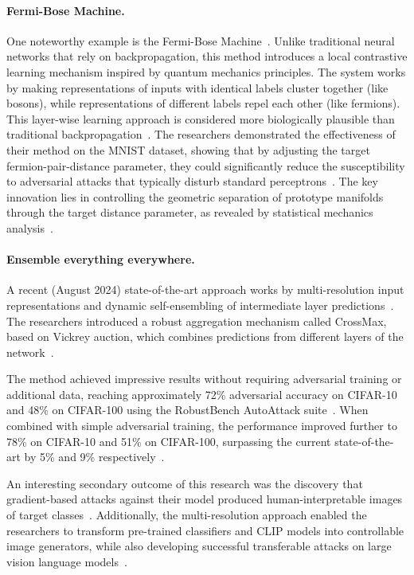 \documentclass[a4paper, oneside]{discothesis}
\begin{document}
\paragraph{Fermi-Bose Machine.} One noteworthy example is the Fermi-Bose Machine~\cite{xie2024fermi}. Unlike traditional neural networks that rely on backpropagation, this method introduces a local contrastive learning mechanism inspired by quantum mechanics principles. The system works by making representations of inputs with identical labels cluster together (like bosons), while representations of different labels repel each other (like fermions). This layer-wise learning approach is considered more biologically plausible than traditional backpropagation~\cite{xie2024fermi}. The researchers demonstrated the effectiveness of their method on the MNIST dataset, showing that by adjusting the target fermion-pair-distance parameter, they could significantly reduce the susceptibility to adversarial attacks that typically disturb standard perceptrons~\cite{xie2024fermi}. The key innovation lies in controlling the geometric separation of prototype manifolds through the target distance parameter, as revealed by statistical mechanics analysis~\cite{xie2024fermi}.

\paragraph{Ensemble everything everywhere.} A recent (August 2024) state-of-the-art approach works by multi-resolution input representations and dynamic self-ensembling of intermediate layer predictions~\cite{fort2024ensemble}. The researchers introduced a robust aggregation mechanism called CrossMax, based on Vickrey auction, which combines predictions from different layers of the network~\cite{fort2024ensemble}.

The method achieved impressive results without requiring adversarial training or additional data, reaching approximately 72\% adversarial accuracy on CIFAR-10 and 48\% on CIFAR-100 using the RobustBench AutoAttack suite~\cite{fort2024ensemble}. When combined with simple adversarial training, the performance improved further to 78\% on CIFAR-10 and 51\% on CIFAR-100, surpassing the current state-of-the-art by 5\% and 9\% respectively~\cite{fort2024ensemble}.

An interesting secondary outcome of this research was the discovery that gradient-based attacks against their model produced human-interpretable images of target classes~\cite{fort2024ensemble}. Additionally, the multi-resolution approach enabled the researchers to transform pre-trained classifiers and CLIP models into controllable image generators, while also developing successful transferable attacks on large vision language models~\cite{fort2024ensemble}.
\end{document}
